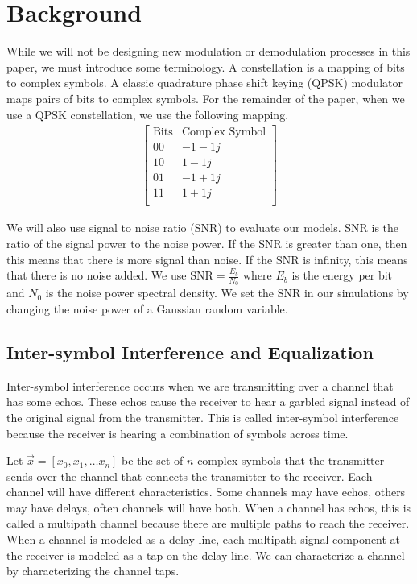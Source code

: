 \section{Background}

While we will not be designing new modulation or demodulation processes in this paper, we must introduce some terminology.
A constellation is a mapping of bits to complex symbols.  
A classic quadrature phase shift keying (QPSK) modulator maps pairs of bits to complex symbols.
For the remainder of the paper, when we use a QPSK constellation, we use the following mapping.
\begin{align*}
\begin{bmatrix}
\text{Bits} & \text{Complex Symbol} \\
\hline
00 & -1-1j \\
10 & 1 -1j \\
01 & -1 + 1j \\
11 & 1+1j \\
\end{bmatrix}
\end{align*}

We will also use signal to noise ratio (SNR) to evaluate our models.  SNR is the ratio of the signal power to the noise power.  
If the SNR is greater than one, then this means that there is more signal than noise.  If the SNR is infinity, this means that there is no noise added.
We use $\text{SNR}=\frac{E_b}{N_0}$ where $E_b$ is the energy per bit and $N_0$ is the noise power spectral density.
We set the SNR in our simulations by changing the noise power of a Gaussian random variable. 

\subsection{Inter-symbol Interference and Equalization}

Inter-symbol interference occurs when we are transmitting over a channel that has some echos.  These echos cause the receiver to hear a garbled signal instead of the original signal from the transmitter.  This is called inter-symbol interference because the receiver is hearing a combination of symbols across time. 

Let $\vec{x}=[x_0, x_1, \ldots x_n]$ be the set of $n$ complex symbols that the transmitter sends over the channel that connects the transmitter to the receiver.
Each channel will have different characteristics. Some channels may have echos, others may have delays, often channels will have both.  When a channel has echos, this is called a multipath channel because there are multiple paths to reach the receiver.  
When a channel is modeled as a delay line, each multipath signal component at the receiver is modeled as a tap on the delay line.  
We can characterize a channel by characterizing the channel taps.

